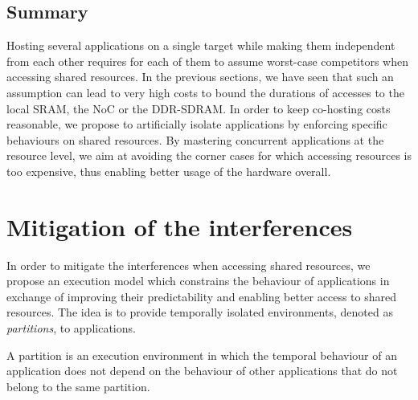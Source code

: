 \documentclass[main.tex]{subfiles}
\begin{document}



\subsection{Summary}

Hosting several applications on a single target while making them independent from each other requires for each of them to assume worst-case competitors when accessing shared resources. In the previous sections, we have seen that such an assumption can lead to very high costs to bound the durations of accesses to the local SRAM, the NoC or the DDR-SDRAM. In order to keep co-hosting costs reasonable, we propose to artificially isolate applications by enforcing specific behaviours on shared resources. By mastering concurrent applications at the resource level, we aim at avoiding the corner cases for which accessing resources is too expensive, thus enabling better usage of the hardware overall.


\section{Mitigation of the interferences}

In order to mitigate the interferences when accessing shared resources, we propose an execution model which constrains the behaviour of applications in exchange of improving their predictability and enabling better access to shared resources. The idea is to provide temporally isolated environments, denoted as \emph{partitions}, to applications. 

\begin{definition}[Partition]
A partition is an execution environment in which the temporal behaviour of an application does not depend on the behaviour of other applications that do not belong to the same partition. 
\end{definition}
\end{document}

